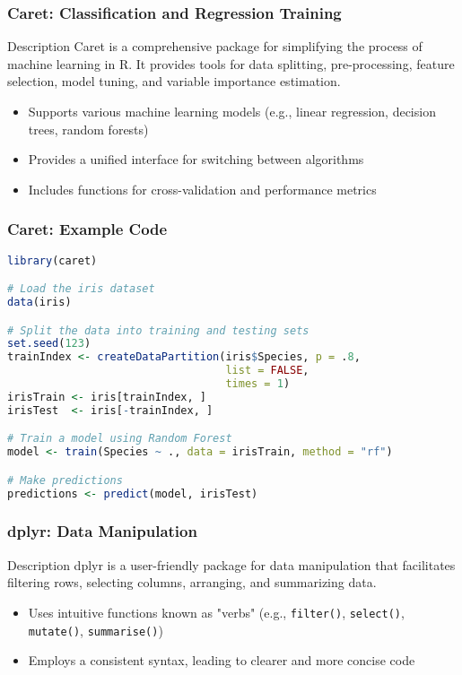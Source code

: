 \documentclass[aspectratio=169]{beamer}
\begin{document}
\begin{frame}[fragile]
    \frametitle{Caret: Classification and Regression Training}
    \begin{block}{Description}
        Caret is a comprehensive package for simplifying the process of machine learning in R.
        It provides tools for data splitting, pre-processing, feature selection, model tuning, and variable importance estimation.
    \end{block}
    \begin{itemize}
        \item Supports various machine learning models (e.g., linear regression, decision trees, random forests)
        \item Provides a unified interface for switching between algorithms
        \item Includes functions for cross-validation and performance metrics
    \end{itemize}
\end{frame}

\begin{frame}[fragile]
    \frametitle{Caret: Example Code}
    \begin{lstlisting}[language=R]
library(caret)

# Load the iris dataset
data(iris)

# Split the data into training and testing sets
set.seed(123)
trainIndex <- createDataPartition(iris$Species, p = .8, 
                                  list = FALSE, 
                                  times = 1)
irisTrain <- iris[trainIndex, ]
irisTest  <- iris[-trainIndex, ]

# Train a model using Random Forest
model <- train(Species ~ ., data = irisTrain, method = "rf")

# Make predictions
predictions <- predict(model, irisTest)
    \end{lstlisting}
\end{frame}

\begin{frame}[fragile]
    \frametitle{dplyr: Data Manipulation}
    \begin{block}{Description}
        dplyr is a user-friendly package for data manipulation that facilitates filtering rows, selecting columns, arranging, and summarizing data.
    \end{block}
    \begin{itemize}
        \item Uses intuitive functions known as "verbs" (e.g., \texttt{filter()}, \texttt{select()}, \texttt{mutate()}, \texttt{summarise()})
        \item Employs a consistent syntax, leading to clearer and more concise code
    \end{itemize}
\end{frame}
\end{document}
